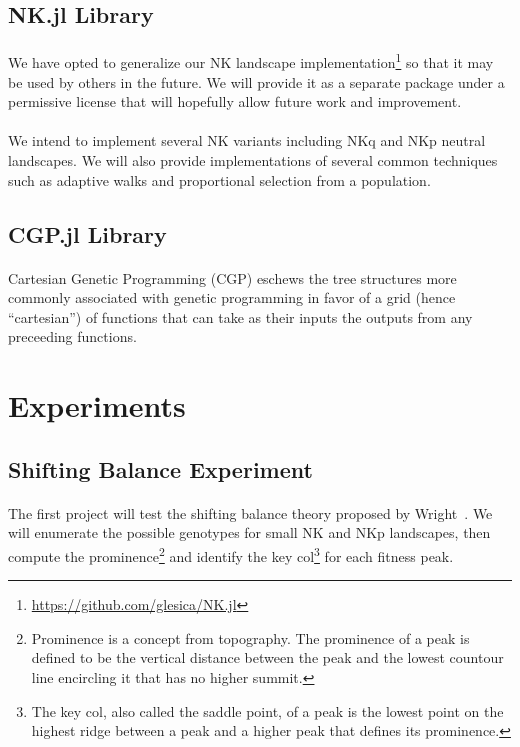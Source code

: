 \documentclass[12pt,letterpaper,titlepage,draft]{article}
\begin{document}
\subsection{NK.jl Library}

\paragraph{}
We have opted to generalize our NK landscape
implementation\footnote{\url{https://github.com/glesica/NK.jl}} so that it may
be used by others in the future. We will provide it as a separate package under
a permissive license that will hopefully allow future work and improvement.

\paragraph{}
We intend to implement several NK variants including NKq and NKp neutral
landscapes. We will also provide implementations of several common techniques
such as adaptive walks and proportional selection from a population.

\subsection{CGP.jl Library}

\paragraph{}
Cartesian Genetic Programming (CGP) eschews the tree structures more commonly
associated with genetic programming in favor of a grid (hence ``cartesian'') of
functions that can take as their inputs the outputs from any preceeding
functions.

\section{Experiments}

\subsection{Shifting Balance Experiment}

\paragraph{}
The first project will test the shifting balance theory proposed by
Wright~\cite{Wright1982}\cite{Wright1931}. We will enumerate the possible
genotypes for small NK and NKp landscapes, then compute the
prominence\footnote{Prominence is a concept from topography. The prominence of
a peak is defined to be the vertical distance between the peak and the
lowest countour line encircling it that has no higher summit.} and identify the
key col\footnote{The key col, also called the saddle point, of a peak is the
lowest point on the highest ridge between a peak and a higher peak that
defines its prominence.} for each fitness peak.
\end{document}
